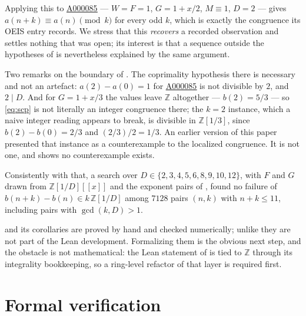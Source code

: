 \documentclass[11pt,a4paper]{article}
\theoremstyle{plain}
\theoremstyle{definition}
\newcommand{\Z}{\mathbb{Z}}
\newcommand{\oeis}[1]{\href{https://oeis.org/#1}{\underline{#1}}}
\begin{document}
Applying this to \oeis{A000085} --- $W=F=1$, $G=1+x/2$, $M\equiv1$, $D=2$ --- gives
$a(n+k)\equiv a(n)\pmod k$ for every odd $k$, which is exactly the congruence its OEIS
entry records. We stress that this \emph{recovers} a recorded observation and settles
nothing that was open; its interest is that a sequence outside the hypotheses of
 is nevertheless explained by the same argument.

Two remarks on the boundary of . The coprimality hypothesis there is
necessary and not an artefact: $a(2)-a(0)=1$ for \oeis{A000085} is not divisible by $2$,
and $2\mid D$. And for $G=1+x/3$ the values leave $\Z$ altogether --- $b(2)=5/3$ --- so
\eqref{eq:scp} is not literally an integer congruence there; the $k=2$ instance, which a
naive integer reading appears to break, is divisible in $\Z[1/3]$, since $b(2)-b(0)=2/3$
and $(2/3)/2=1/3$. An earlier version of this paper presented that instance as a
counterexample to the localized congruence. It is not one, and  shows
no counterexample exists.

Consistently with that, a search over $D\in\{2,3,4,5,6,8,9,10,12\}$, with $F$ and $G$ drawn
from $\Z[1/D][[x]]$ and the exponent pairs of , found no failure of
$b(n+k)-b(n)\in k\,\Z[1/D]$ among $7128$ pairs $(n,k)$ with $n+k\le11$, including pairs
with $\gcd(k,D)>1$.

 and its corollaries are proved by hand and checked numerically; unlike
 they are not part of the Lean development. Formalizing them is the obvious
next step, and the obstacle is not mathematical: the Lean statement of 
is tied to $\Z$ through its integrality bookkeeping, so a ring-level refactor of that layer
is required first.

\section{Formal verification}\label{sec:lean}
\end{document}
